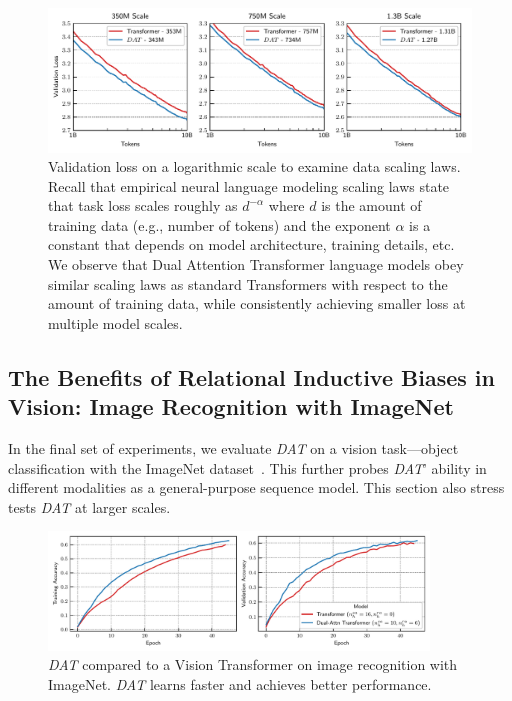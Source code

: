 \begin{figure}
    \includegraphics[width=\textwidth]{figs/experiments/fineweb/valloss_logtok.pdf}
    \caption{Validation loss on a logarithmic scale to examine data scaling laws. Recall that empirical neural language modeling scaling laws state that task loss scales roughly as $d^{-\alpha}$ where $d$ is the amount of training data (e.g., number of tokens) and the exponent $\alpha$ is a constant that depends on model architecture, training details, etc. We observe that Dual Attention Transformer language models obey similar scaling laws as standard Transformers with respect to the amount of training data, while consistently achieving smaller loss at multiple model scales.}
\end{figure}


\subsection{The Benefits of Relational Inductive Biases in Vision: Image Recognition with ImageNet}\label{ssec:imagenet}

In the final set of experiments, we evaluate \textit{DAT} on a vision task---object classification with the ImageNet dataset~\citep{imagenet}. This further probes \textit{DAT}' ability in different modalities as a general-purpose sequence model. This section also stress tests \textit{DAT} at larger scales.

\begin{figure}[ht]
    \centering
    \includegraphics[width=0.9\textwidth]{figs/experiments/imagenet/imagenet_acc_curves.pdf}
    \caption{\textit{DAT} compared to a Vision Transformer on image recognition with ImageNet. \textit{DAT} learns faster and achieves better performance.}\label{fig:vision_acc_curve}
\end{figure}

